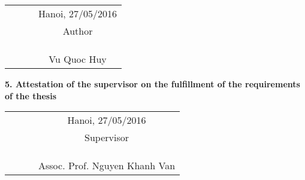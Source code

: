 \begin{acknowledgementslong}
\begin{tabular}{l l l c }
    \textbf{ } \hspace*{35pt} \textbf{ } &  \textbf{ } \hspace*{35pt} \textbf{ } & \textbf{ } \hspace*{35pt} \textbf{ } & Hanoi, 27/05/2016 \\ 
    \textbf{ } \hspace*{35pt} \textbf{ } &  \textbf{ } \hspace*{35pt} \textbf{ } & \textbf{ } \hspace*{35pt} \textbf{ } & Author \\
    \\
    \\
    \\
    \textbf{ } \hspace*{35pt} \textbf{ } &  \textbf{ } \hspace*{35pt} \textbf{ } & \textbf{ } \hspace*{35pt} \textbf{ } & Vu Quoc Huy
    \end{tabular}

    
\textbf{5. Attestation of the supervisor on the fulfillment of the requirements of the thesis}
\\[5cm]
\begin{tabular}{l l l c }
    \textbf{ } \hspace*{35pt} \textbf{ } &  \textbf{ } \hspace*{35pt} \textbf{ } & \textbf{ } \hspace*{35pt} \textbf{ } & Hanoi, 27/05/2016 \\ 
    \textbf{ } \hspace*{35pt} \textbf{ } &  \textbf{ } \hspace*{35pt} \textbf{ } & \textbf{ } \hspace*{35pt} \textbf{ } & Supervisor \\
    \\
    \\
    \\
    \textbf{ } \hspace*{35pt} \textbf{ } &  \textbf{ } \hspace*{35pt} \textbf{ } & \textbf{ } \hspace*{35pt} \textbf{ } & Assoc. Prof. Nguyen Khanh Van
    \end{tabular}

\end{acknowledgementslong}
  